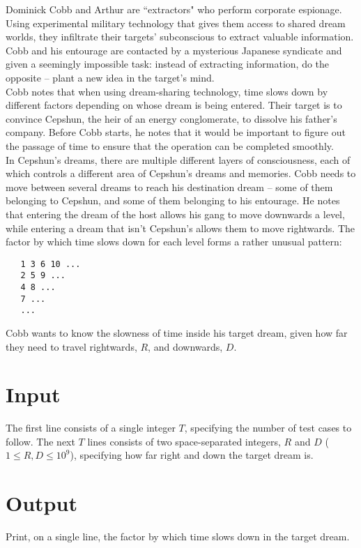 
\noindent Dominick Cobb and Arthur are ``extractors" who perform corporate espionage. Using experimental military technology that gives them access to shared dream worlds, they infiltrate their targets' subconscious to extract valuable information. Cobb and his entourage are contacted by a mysterious Japanese syndicate and given a seemingly impossible task: instead of extracting information, do the opposite -- plant a new idea in the target's mind.\\

Cobb notes that when using dream-sharing technology, time slows down by different factors depending on whose dream is being entered. Their target is to convince Cepshun, the heir of an energy conglomerate, to dissolve his father's company. Before Cobb starts, he notes that it would be important to figure out the passage of time to ensure that the operation can be completed smoothly.\\

In Cepshun's dreams, there are multiple different layers of consciousness, each of which controls a different area of Cepshun's dreams and memories. Cobb needs to move between several dreams to reach his destination dream -- some of them belonging to Cepshun, and some of them belonging to his entourage. He notes that entering the dream of the host allows his gang to move downwards a level, while entering a dream that isn't Cepshun's allows them to move rightwards. The factor by which time slows down for each level forms a rather unusual pattern:

\begin{verbatim}
   1 3 6 10 ...
   2 5 9 ...
   4 8 ...
   7 ...
   ...
\end{verbatim}

\noindent Cobb wants to know the slowness of time inside his target dream, given how far they need to travel rightwards, $R$, and downwards, $D$.

\section*{Input}
The first line consists of a single integer $T$, specifying the number of test cases to follow.
The next $T$ lines consists of two space-separated integers, $R$ and $D$ ($1 \leq R, D \leq 10^{9}$), specifying how far right and down the target dream is.

\section*{Output}
Print, on a single line, the factor by which time slows down in the target dream.\\
